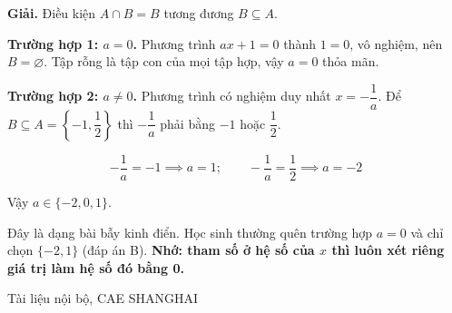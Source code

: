 \documentclass[11pt, a4paper]{article}
\begin{document}
\textbf{Giải.} Điều kiện $A \cap B = B$ tương đương $B \subseteq A$.

\textbf{Trường hợp 1: $a = 0$.} Phương trình $ax + 1 = 0$ thành $1 = 0$, vô nghiệm, nên $B = \varnothing$. Tập rỗng là tập con của mọi tập hợp, vậy $a = 0$ thỏa mãn.

\textbf{Trường hợp 2: $a \neq 0$.} Phương trình có nghiệm duy nhất $x = -\dfrac{1}{a}$. Để $B \subseteq A = \left\{-1, \dfrac{1}{2}\right\}$ thì $-\dfrac{1}{a}$ phải bằng $-1$ hoặc $\dfrac{1}{2}$.

$$-\frac{1}{a} = -1 \implies a = 1; \qquad -\frac{1}{a} = \frac{1}{2} \implies a = -2$$

Vậy $a \in \{-2, 0, 1\}$.

 Đây là dạng bài bẫy kinh điển. Học sinh thường quên trường hợp $a = 0$ và chỉ chọn $\{-2, 1\}$ (đáp án B). \textbf{Nhớ: tham số ở hệ số của $x$ thì luôn xét riêng giá trị làm hệ số đó bằng 0.}
\vspace{0.8cm}
\begin{center}
{\footnotesize\color{cae_blue} Tài liệu nội bộ, CAE SHANGHAI}
\end{center}
\end{document}
